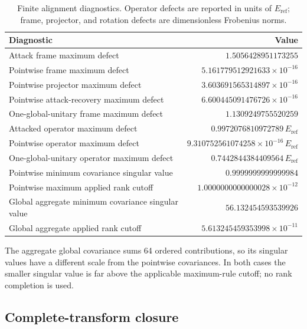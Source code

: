 \documentclass[11pt]{article}
\newcommand{\eref}{E_{\mathrm{ref}}}
\begin{document}
\begin{table}[!htbp]
\centering
\caption{Finite alignment diagnostics.  Operator defects are reported in units of
$\eref$; frame, projector, and rotation defects are dimensionless Frobenius norms.}
\label{tab:alignment-diagnostics}
\begin{tabular}{@{}lr@{}}
\toprule
Diagnostic & Value \\
\midrule
Attack frame maximum defect & $1.5056428951173255$ \\
Pointwise frame maximum defect & $5.161779512921633\times10^{-16}$ \\
Pointwise projector maximum defect & $3.603691565314897\times10^{-16}$ \\
Pointwise attack-recovery maximum defect & $6.600445091476726\times10^{-16}$ \\
One-global-unitary frame maximum defect & $1.1309249755520259$ \\
Attacked operator maximum defect & $0.9972076810972789\,\eref$ \\
Pointwise operator maximum defect & $9.310752561074258\times10^{-16}\,\eref$ \\
One-global-unitary operator maximum defect & $0.7442844384409564\,\eref$ \\
Pointwise minimum covariance singular value & $0.9999999999999984$ \\
Pointwise maximum applied rank cutoff & $1.0000000000000028\times10^{-12}$ \\
Global aggregate minimum covariance singular value & $56.132454593539926$ \\
Global aggregate applied rank cutoff & $5.613245459353998\times10^{-11}$ \\
\bottomrule
\end{tabular}
\end{table}

The aggregate global covariance sums 64 ordered contributions, so its singular values
have a different scale from the pointwise covariances.  In both cases the smaller
singular value is far above the applicable maximum-rule cutoff; no rank completion is
used.

\subsection{Complete-transform closure}
\end{document}
